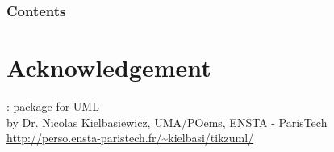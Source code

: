 \documentclass[aspectratio=169]{beamer}
\title[\tc]{\deliv{\sds}{Presentation}}
\date{\datesds}
\begin{document}

\begin{frame}
\maketitle
\begin{center}
\names
\end{center}
\end{frame}

\begin{frame}
\frametitle{Contents}
\setlength{\columnsep}{0.11in}
\tableofcontents
\end{frame}









\section{Acknowledgement}
\begin{frame}
: \tex{} package for UML \\
by Dr. Nicolas Kielbasiewicz, UMA/POems, ENSTA - ParisTech \\
\url{http://perso.ensta-paristech.fr/~kielbasi/tikzuml/}
\end{frame}

\end{document}
